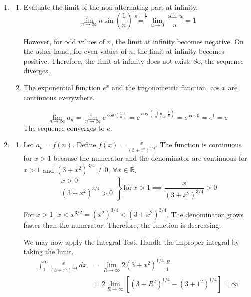 \documentclass[a4paper, 12pt]{article}
\renewcommand{\headrulewidth}{0pt}
\begin{document}
\newpage
\pagestyle{fancy}
\renewcommand{\headrulewidth}{1pt}


\begin{enumerate}[leftmargin=*,label=\textbf{\arabic*.}]

\item \begin{enumerate}[leftmargin=*,label=\textbf{\alph*.}]
\item Evaluate the limit of the non-alternating part at infinity.
\[\lim_{n\to\infty}n\sin\left(\frac1n\right)\overset{n=\frac1u}{=}\lim_{u\to0}\frac{\sin u}u=1\]

However, for odd values of $n$, the limit at infinity becomes negative. On the other hand, for even values of $n$, the limit at infinity becomes positive. Therefore, the limit at infinity does not exist. So, the sequence diverges.
\item The exponential function $ e^x$ and the trigonometric function $\cos x$ are continuous everywhere.

\[\lim_{n\to\infty}a_n=\lim_{n\to\infty} e^{\displaystyle\cos\left(\frac1n\right)}= e^{\displaystyle\cos\left(\lim_{n\to\infty}\frac1n\right)}= e^{\cos0}= e^1= e\]
The sequence converges to $\boxed{ e}$.
\end{enumerate}

\item \begin{enumerate}[leftmargin=*,label=\textbf{\alph*.}]

\item Let $a_n=f(n)$. Define $\displaystyle f(x)=\frac x{\left(3+x^2\right)^{3/4}}$. The function is continuous for $x>1$ because the numerator and the denominator are continuous for $x>1$ and $\left(3+x^2\right)^{3/4}\neq0,\:\forall x\in\mathbb{R}$.
\[\left.\begin{array}{c}
x>0\\
\left(3+x^2\right)^{3/4}>0
\end{array}\right\}\:\text{for}\:x>1\implies\frac x{\left(3+x^2\right)^{3/4}}>0\]

For $x>1$, $x<x^{3/2}=\left(x^2\right)^{3/4}<\left(3+x^2\right)^{3/4}$. The denominator grows faster than the numerator. Therefore, the function is decreasing.

We may now apply the Integral Test. Handle the improper integral by taking the limit.
\begin{align*}
\int_1^\infty\frac{x}{(3+x^2)^{3/4}}\,dx
&= \lim_{R\to\infty}2(3+x^2)^{1/4}\bigg|_1^R\\[1em]
&= 2\lim_{R\to\infty}\left[(3+R^2)^{1/4}-(3+1^2)^{1/4}\right]= \infty
\end{align*}


\end{enumerate}
\end{enumerate}
\end{document}
